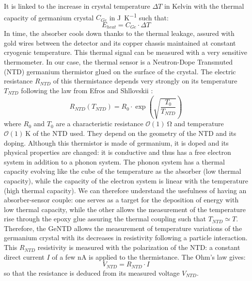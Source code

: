 It is linked to the increase in crystal temperature $\Delta T$ in Kelvin with the thermal capacity of germanium crystal $C_{Ge}$ in \si{\joule\per\kelvin} such that:
\begin{equation}
E_{heat} = C_{Ge} \cdot \Delta T
\end{equation}
In time, the absorber cools down thanks to the thermal leakage, assured with gold wires between the detector and its copper chassis maintained at constant cryogenic temperature.
This thermal signal can be measured with a very sensitive thermometer. In our case, the thermal sensor is a Neutron-Dope Transmuted (NTD) germanium thermistor glued on the surface of the crystal. The electric resistance $R_{NTD}$ of this thermistance depends very strongly on its temperature $T_{NTD}$ following the law from Efros and Shllovskii \cite{Mathimalar:2014sfa}:
\begin{equation}
\label{eq:ntd-resistivity}
R_{NTD}(T_{NTD}) = R_0 \cdot \exp(\sqrt{\frac{T_0}{T_{NTD}}})
\end{equation}
where $R_0$ and $T_0$ are a characteristic resistance $\mathcal{O}(1)\ \si{\ohm}$ and temperature $\mathcal{O}(1)\ \si{\kelvin}$ of the NTD used. They depend on the geometry of the NTD and its doping. 
Although this thermistor is made of germanium, it is doped and its physical properties are changed: it is conductive and thus has a free electron system in addition to a phonon system. The phonon system has a thermal capacity evolving like the cube of the temperature as the absorber (low thermal capacity), while the capacity of the electron system is linear with the temperature (high thermal capacity). We can therefore understand the usefulness of having an absorber-sensor couple: one serves as a target for the deposition of energy with low thermal capacity, while the other allows the measurement of the temperature rise through the epoxy glue assuring the thermal coupling such that $T_{NTD} \simeq T$.
Therefore, the GeNTD allows the measurement of temperature variations of the germanium crystal with its decreases in resistivity following a particle interaction.
This $R_{NTD}$ resistivity is measured with the polarization of the NTD: a constant direct current $I$ of a few \si{\nano\ampere} is applied to the  thermistance. The Ohm's law gives:
\begin{equation}
V_{NTD} = R_{NTD} \cdot I
\end{equation}
so that the resistance is deduced from its measured voltage $V_{NTD}$.

